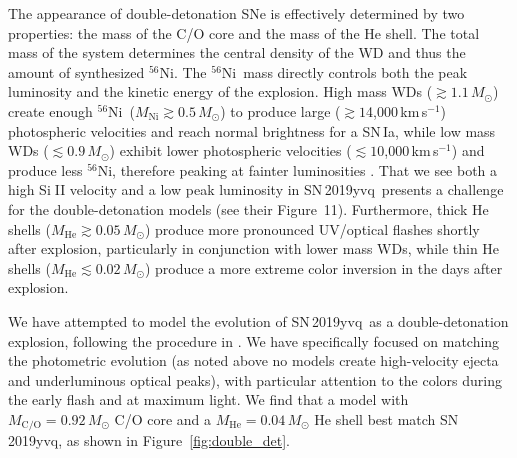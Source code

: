 \documentclass[twocolumn]{aastex63}
\def\ion#1#2{#1$\;${\footnotesize\rm{#2}}\relax}
\newcommand{\kms}{km\,s$^{-1}$}
\newcommand{\radni}{$^{56}$Ni}
\newcommand{\sn}{SN\,2019yvq}
\begin{document}
The appearance of double-detonation SNe is effectively determined by two
properties: the mass of the C/O core and the mass of the He shell. The total
mass of the system determines the central density of the WD and thus the
amount of synthesized \radni. The \radni\ mass directly controls both the peak
luminosity and the kinetic energy of the explosion. High mass WDs ($\gtrsim
1.1\,M_\odot$) create enough \radni\ ($M_\mathrm{Ni} \gtrsim 0.5\,M_\odot$) to
produce large ($\gtrsim 1$4,000\,\kms) photospheric velocities and reach
normal brightness for a SN\,Ia, while low mass WDs ($\lesssim 0.9\,M_\odot$)
exhibit lower photospheric velocities ($\lesssim 1$0,000\,\kms) and produce
less \radni, therefore peaking at fainter luminosities \citep{Polin19}. That
we see both a high \ion{Si}{II} velocity and a low peak luminosity in \sn\
presents a challenge for the \citet{Polin19} double-detonation models (see
their Figure~11). Furthermore, thick He shells ($M_\mathrm{He} \gtrsim
0.05\,M_\odot$) produce more pronounced UV/optical flashes shortly after
explosion, particularly in conjunction with lower mass WDs, while thin He
shells ($M_\mathrm{He} \lesssim 0.02\,M_\odot$) produce a more extreme color
inversion in the days after explosion.

We have attempted to model the evolution of \sn\ as a double-detonation
explosion, following the procedure in \citet{Polin19}. We have specifically
focused on matching the photometric evolution (as noted above no models create
high-velocity ejecta and underluminous optical peaks), with particular
attention to the colors during the early flash and at maximum light. We find
that a model with $M_\mathrm{C/O} = 0.92\,M_\odot$ C/O core and a
$M_\mathrm{He} = 0.04\,M_\odot$ He shell best match \sn, as shown in
Figure~\ref{fig:double_det}.
\end{document}
